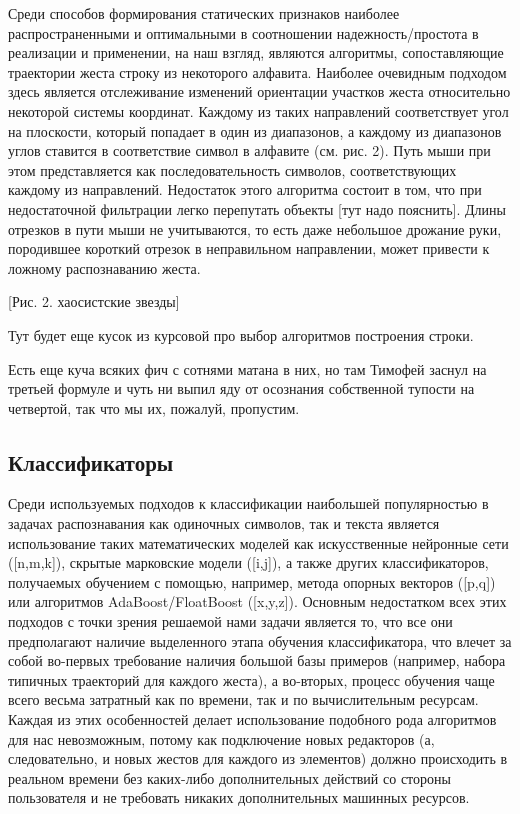\documentclass[a5paper]{article}
\begin{document}
Среди способов формирования статических признаков наиболее распространенными и оптимальными в соотношении надежность/простота в реализации и 
применении, на наш взгляд, являются алгоритмы, сопоставляющие траектории жеста строку из некоторого алфавита. Наиболее очевидным подходом здесь является отслеживание 
изменений ориентации участков жеста относительно некоторой системы координат. Каждому из таких направлений соответствует угол на плоскости, который попадает в 
один из диапазонов, а каждому из диапазонов углов ставится в соответствие символ в алфавите (см. рис. 2). Путь мыши при этом представляется как последовательность символов, 
соответствующих каждому из направлений. Недостаток этого алгоритма состоит в том, что при недостаточной фильтрации легко перепутать объекты [тут надо пояснить]. Длины отрезков 
в пути мыши не учитываются, то есть даже небольшое дрожание руки, породившее короткий отрезок в неправильном направлении, может привести к ложному распознаванию жеста.

[Рис. 2. хаосистские звезды]

Тут будет еще кусок из курсовой про выбор алгоритмов построения строки.

Есть еще куча всяких фич с сотнями матана в них, но там Тимофей заснул на третьей формуле и чуть ни выпил яду от осознания собственной тупости на четвертой, так что 
мы их, пожалуй, пропустим.

\subsection{Классификаторы}

Среди используемых подходов к классификации наибольшей популярностью в задачах распознавания как одиночных символов, так и текста является использование таких математических моделей как 
искусственные нейронные сети ([n,m,k]), скрытые марковские модели ([i,j]), а также других классификаторов, получаемых обучением с помощью, например, метода
опорных векторов ([p,q]) или алгоритмов AdaBoost/FloatBoost ([x,y,z]). Основным недостатком всех этих подходов с точки зрения решаемой нами задачи является
то, что все они предполагают наличие выделенного этапа обучения классификатора, что влечет за собой во-первых требование наличия большой базы примеров (например, набора 
типичных траекторий для каждого жеста), а во-вторых, процесс обучения чаще всего весьма затратный как по времени, так и по вычислительным ресурсам. 
Каждая из этих особенностей делает использование подобного рода алгоритмов для нас невозможным, потому как подключение новых редакторов (а, следовательно, и 
новых жестов для каждого из элементов) должно происходить в реальном времени без каких-либо дополнительных действий со стороны пользователя и не требовать 
никаких дополнительных машинных ресурсов. 
\end{document}
